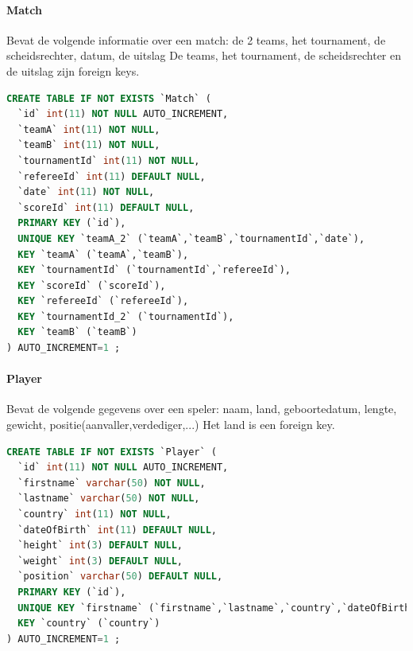 \documentclass[11pt]{article}
\begin{document}
        
        
        
        
    \paragraph{Match}
        Bevat de volgende informatie over een match:
            de 2 teams, het tournament, de scheidsrechter, datum, de uitslag
        De teams, het tournament, de scheidsrechter en de uitslag zijn foreign keys.
        
        \begin{framed}
        \begin{lstlisting}[language=sql]
CREATE TABLE IF NOT EXISTS `Match` (
  `id` int(11) NOT NULL AUTO_INCREMENT,
  `teamA` int(11) NOT NULL,
  `teamB` int(11) NOT NULL,
  `tournamentId` int(11) NOT NULL,
  `refereeId` int(11) DEFAULT NULL,
  `date` int(11) NOT NULL,
  `scoreId` int(11) DEFAULT NULL,
  PRIMARY KEY (`id`),
  UNIQUE KEY `teamA_2` (`teamA`,`teamB`,`tournamentId`,`date`),
  KEY `teamA` (`teamA`,`teamB`),
  KEY `tournamentId` (`tournamentId`,`refereeId`),
  KEY `scoreId` (`scoreId`),
  KEY `refereeId` (`refereeId`),
  KEY `tournamentId_2` (`tournamentId`),
  KEY `teamB` (`teamB`)
) AUTO_INCREMENT=1 ;
        \end{lstlisting}
        \end{framed}
        
        
        
        
    \paragraph{Player}
        Bevat de volgende gegevens over een speler:
            naam, land, geboortedatum, lengte, gewicht, positie(aanvaller,verdediger,...)
        Het land is een foreign key.
        
        \begin{framed}
        \begin{lstlisting}[language=sql]
CREATE TABLE IF NOT EXISTS `Player` (
  `id` int(11) NOT NULL AUTO_INCREMENT,
  `firstname` varchar(50) NOT NULL,
  `lastname` varchar(50) NOT NULL,
  `country` int(11) NOT NULL,
  `dateOfBirth` int(11) DEFAULT NULL,
  `height` int(3) DEFAULT NULL,
  `weight` int(3) DEFAULT NULL,
  `position` varchar(50) DEFAULT NULL,
  PRIMARY KEY (`id`),
  UNIQUE KEY `firstname` (`firstname`,`lastname`,`country`,`dateOfBirth`),
  KEY `country` (`country`)
) AUTO_INCREMENT=1 ;
        \end{lstlisting}
        \end{framed}
        
\end{document}
